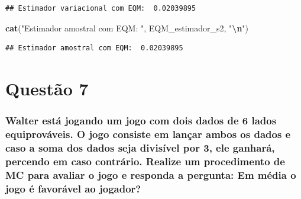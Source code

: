 \documentclass[
]{article}
\newenvironment{Shaded}{\begin{snugshade}}{\end{snugshade}}
\newcommand{\FunctionTok}[1]{\textcolor[rgb]{0.13,0.29,0.53}{\textbf{#1}}}
\newcommand{\NormalTok}[1]{#1}
\newcommand{\SpecialCharTok}[1]{\textcolor[rgb]{0.81,0.36,0.00}{\textbf{#1}}}
\newcommand{\StringTok}[1]{\textcolor[rgb]{0.31,0.60,0.02}{#1}}
\begin{document}
\begin{verbatim}
## Estimador variacional com EQM:  0.02039895
\end{verbatim}

\begin{Shaded}
\begin{Highlighting}[]
\FunctionTok{cat}\NormalTok{(}\StringTok{"Estimador amostral com EQM: "}\NormalTok{, EQM\_estimador\_s2, }\StringTok{"}\SpecialCharTok{\textbackslash{}n}\StringTok{"}\NormalTok{)}
\end{Highlighting}
\end{Shaded}

\begin{verbatim}
## Estimador amostral com EQM:  0.02039895
\end{verbatim}

\section{Questão 7}\label{questuxe3o-7}

\subsubsection{Walter está jogando um jogo com dois dados de 6 lados
equiprováveis. O jogo consiste em lançar ambos os dados e caso a soma
dos dados seja divisível por 3, ele ganhará, percendo em caso contrário.
Realize um procedimento de MC para avaliar o jogo e responda a pergunta:
Em média o jogo é favorável ao
jogador?}\label{walter-estuxe1-jogando-um-jogo-com-dois-dados-de-6-lados-equiprovuxe1veis.-o-jogo-consiste-em-lanuxe7ar-ambos-os-dados-e-caso-a-soma-dos-dados-seja-divisuxedvel-por-3-ele-ganharuxe1-percendo-em-caso-contruxe1rio.-realize-um-procedimento-de-mc-para-avaliar-o-jogo-e-responda-a-pergunta-em-muxe9dia-o-jogo-uxe9-favoruxe1vel-ao-jogador}
\end{document}
